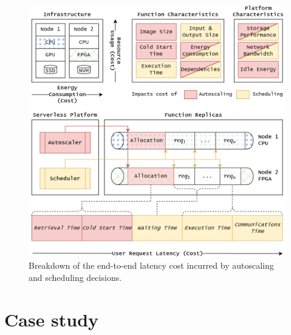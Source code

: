 

\begin{figure}[t]
    \centering
    \includegraphics[width=\columnwidth]{7_Chapitre5/figures/serverless-cost.png}
    \caption{Breakdown of the end-to-end latency cost incurred by autoscaling and scheduling decisions.}
\label{figure:herosim-cost}
\end{figure}

\section{Case study}
\label{section:herosim-case-study}


